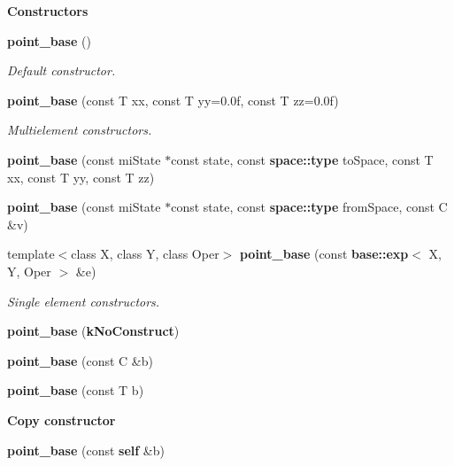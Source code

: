 \begin{Indent}{\bf Constructors}\par
\begin{CompactItemize}
\item 
{\bf point\_\-base} ()
\begin{CompactList}\small\item\em Default constructor. \item\end{CompactList}\item 
{\bf point\_\-base} (const T xx, const T yy=0.0f, const T zz=0.0f)
\begin{CompactList}\small\item\em Multielement constructors. \item\end{CompactList}\item 
{\bf point\_\-base} (const mi\-State $\ast$const state, const {\bf space::type} to\-Space, const T xx, const T yy, const T zz)
\item 
{\bf point\_\-base} (const mi\-State $\ast$const state, const {\bf space::type} from\-Space, const C \&v)
\item 
template$<$class X, class Y, class Oper$>$ {\bf point\_\-base} (const {\bf base::exp}$<$ X, Y, Oper $>$ \&e)
\begin{CompactList}\small\item\em Single element constructors. \item\end{CompactList}\item 
{\bf point\_\-base} ({\bf k\-No\-Construct})
\item 
{\bf point\_\-base} (const C \&b)
\item 
{\bf point\_\-base} (const T b)
\end{CompactItemize}
\end{Indent}
\begin{Indent}{\bf Copy constructor}\par
\begin{CompactItemize}
\item 
{\bf point\_\-base} (const {\bf self} \&b)
\end{CompactItemize}
\end{Indent}
